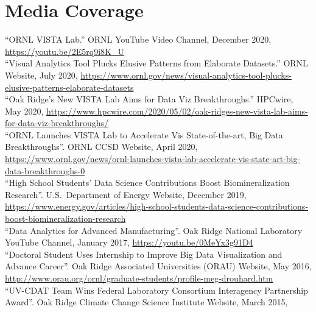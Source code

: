 \documentclass[11pt, letterpaper]{article}
\newcommand{\years}[1]{\marginnote{\scriptsize #1}}
\begin{document}
\section*{Media Coverage}
\begin{sloppypar}
\noindent\years{2020}``ORNL VISTA Lab.'' ORNL YouTube Video Channel, December 2020, \href{https://youtu.be/2E5rq9i8K_U}{https://youtu.be/2E5rq9i8K\_U}\\
\years{2020}``Visual Analytics Tool Plucks Elusive Patterns from Elaborate Datasets.'' ORNL Website, July 2020,
\href{https://www.ornl.gov/news/visual-analytics-tool-plucks-elusive-patterns-elaborate-datasets}{https://www.ornl.gov/news/visual-analytics-tool-plucks-elusive-patterns-elaborate-datasets}\\
\years{2020}``Oak Ridge's New VISTA Lab Aims for Data Viz Breakthroughs.'' HPCwire, May 2020,
\href{https://www.hpcwire.com/2020/05/02/oak-ridges-new-vista-lab-aims-for-data-viz-breakthroughs/}{https://www.hpcwire.com/2020/05/02/oak-ridges-new-vista-lab-aims-for-data-viz-breakthroughs/}\\
\years{2020}``ORNL Launches VISTA Lab to Accelerate Vis State-of-the-art, Big Data Breakthroughs''. ORNL CCSD Website, April 2020,
\href{https://www.ornl.gov/news/ornl-launches-vista-lab-accelerate-vis-state-art-big-data-breakthroughs-0}{https://www.ornl.gov/news/ornl-launches-vista-lab-accelerate-vis-state-art-big-data-breakthroughs-0}\\
\noindent\years{2019}``High School Students' Data Science Contributions Boost Biomineralization Research''. U.S.\ Department of Energy Website, December 2019,
\href{https://www.energy.gov/articles/high-school-students-data-science-contributions-boost-biomineralization-research}{https://www.energy.gov/articles/high-school-students-data-science-contributions-boost-biomineralization-research}\\
\years{2017}``Data Analytics for Advanced Manufacturing''. Oak Ridge National Laboratory YouTube Channel, January 2017,
\href{https://youtu.be/0MeYx3g91D4}{https://youtu.be/0MeYx3g91D4}\\
\years{2016}``Doctoral Student Uses Internship to Improve Big Data
Visualization and Advance Career''. Oak Ridge Associated Universities (ORAU) Website, May 2016,
\href{http://www.orau.org/ornl/graduate-students/profile-meg-drouhard.htm}{http://www.orau.org/ornl/graduate-students/profile-meg-drouhard.htm}\\
\years{2015}``UV-CDAT Team Wins Federal Laboratory Consortium Interagency
Partnership Award''. Oak Ridge Climate Change Science Institute Website, March 2015,

\end{sloppypar}
\end{document}
